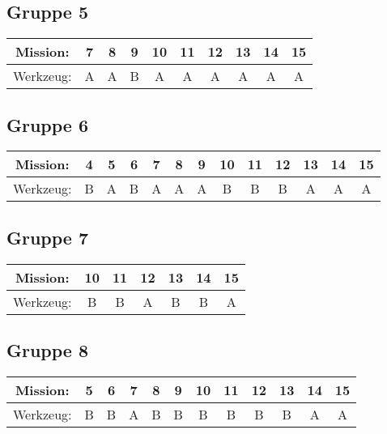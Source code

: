 \documentclass[]{article}
\begin{document}
\subsection*{Gruppe 5}
\begin{tabular}{|c|c|c|c|c|c|c|c|c|c|}
\hline
Mission: & 7 & 8 & 9 & 10 & 11 & 12 & 13 & 14 & 15\\
\hline
Werkzeug: & A & A & B & A & A & A & A & A & A\\
\hline
\end{tabular}


\subsection*{Gruppe 6}
\begin{tabular}{|c|c|c|c|c|c|c|c|c|c|c|c|c|}
\hline
Mission: & 4 & 5 & 6 & 7 & 8 & 9 & 10 & 11 & 12 & 13 & 14 & 15\\
\hline
Werkzeug: & B & A & B & A & A & A & B & B & B & A & A & A\\
\hline
\end{tabular}


\subsection*{Gruppe 7}
\begin{tabular}{|c|c|c|c|c|c|c|}
\hline
Mission: & 10 & 11 & 12 & 13 & 14 & 15\\
\hline
Werkzeug: & B & B & A & B & B & A\\
\hline
\end{tabular}


\subsection*{Gruppe 8}
\begin{tabular}{|c|c|c|c|c|c|c|c|c|c|c|c|}
\hline
Mission: & 5 & 6 & 7 & 8 & 9 & 10 & 11 & 12 & 13 & 14 & 15\\
\hline
Werkzeug: & B & B & A & B & B & B & B & B & B & A & A\\
\hline
\end{tabular}
\end{document}
